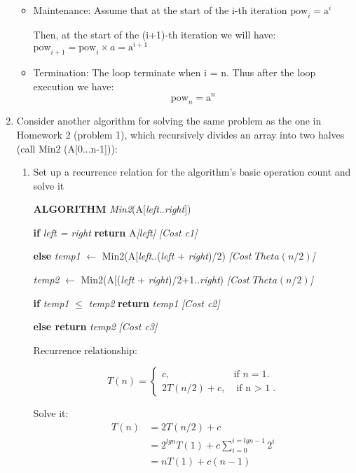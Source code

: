 \documentclass[11pts]{report}
\begin{document}
\begin{enumerate}
\begin{itemize}
\item Maintenance:
Assume that at the start of the i-th iteration $\text{pow}_i = \text{a}^i$
\par Then, at the start of the (i+1)-th iteration we will have:
$\text{pow}_{i+1} = \text{pow}_i\times a = \text{a}^{i+1}$
\item Termination: The loop terminate when i = n. Thus after the loop execution we have:
\begin{equation*}
\text{pow}_n = \text{a}^n
\end{equation*}

\end{itemize}

\item Consider another algorithm for solving the same problem as the one in Homework 2 (problem 1), which recursively divides an array into two halves (call Min2 (A[0...n-1])):

\begin{enumerate}
\item Set up a recurrence relation for the algorithm's basic operation count and solve it
\par \textbf{ALGORITHM} \textit{Min2}(A[\textit{left}..\textit{right}])
\par \quad \textbf{if} \textit{left = right}  \textbf{return} A\textit{[left]} \quad \textit{[Cost c1]}
\par \quad \textbf{else} \textit{temp1} $\gets$ Min2(A[\textit{left}..(\textit{left} + \textit{right})/2) \textit{[Cost $Theta(n/2)$]}
\par \quad \quad \textit{temp2} $\gets$ Min2(A[(\textit{left} + \textit{right})/2+1..\textit{right}) \textit{[Cost $Theta(n/2)$]}
\par \quad \quad \textbf{if} \textit{temp1} $\leq$ \textit{temp2} \textbf{return} \textit{temp1} \textit{[Cost c2]}
\par \quad \quad \textbf{else return} \textit{temp2} \textit{[Cost c3]}

Recurrence relationship:

\begin{equation*}
  T(n)=\begin{cases}
    c, & \text{if $n=1$}.\\
    2T(n/2) + c, & \text{if n $>$ 1}.
  \end{cases}
\end{equation*}

Solve it:
\begin{align*}
T(n) &= 2T(n/2) + c\\
     &= 2^{lgn}T(1) + c\sum_{i=0}^{i=lgn-1}2^i \\
     &= nT(1) + c(n-1)
\end{align*}


\end{enumerate}
\end{enumerate}
\end{document}
